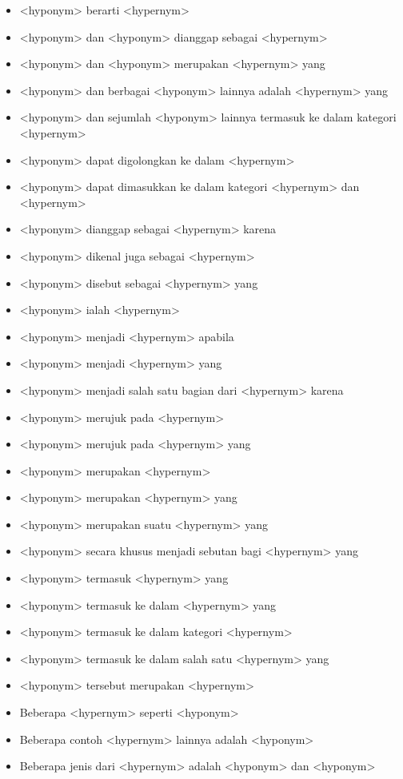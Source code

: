 \begin{itemize}
  \item <hyponym> berarti <hypernym>
  \item <hyponym> dan <hyponym> dianggap sebagai <hypernym>
  \item <hyponym> dan <hyponym> merupakan <hypernym> yang
  \item <hyponym> dan berbagai <hyponym> lainnya adalah <hypernym> yang
  \item <hyponym> dan sejumlah <hyponym> lainnya termasuk ke dalam kategori <hypernym>
  \item <hyponym> dapat digolongkan ke dalam <hypernym>
  \item <hyponym> dapat dimasukkan ke dalam kategori <hypernym> dan <hypernym>
  \item <hyponym> dianggap sebagai <hypernym> karena
  \item <hyponym> dikenal juga sebagai <hypernym>
  \item <hyponym> disebut sebagai <hypernym> yang
  \item <hyponym> ialah <hypernym>
  \item <hyponym> menjadi <hypernym> apabila
  \item <hyponym> menjadi <hypernym> yang
  \item <hyponym> menjadi salah satu bagian dari <hypernym> karena
  \item <hyponym> merujuk pada <hypernym>
  \item <hyponym> merujuk pada <hypernym> yang
  \item <hyponym> merupakan <hypernym>
  \item <hyponym> merupakan <hypernym> yang
  \item <hyponym> merupakan suatu <hypernym> yang
  \item <hyponym> secara khusus menjadi sebutan bagi <hypernym> yang
  \item <hyponym> termasuk <hypernym> yang
  \item <hyponym> termasuk ke dalam <hypernym> yang
  \item <hyponym> termasuk ke dalam kategori <hypernym>
  \item <hyponym> termasuk ke dalam salah satu <hypernym> yang
  \item <hyponym> tersebut merupakan <hypernym>
  \item Beberapa <hypernym> seperti <hyponym>
  \item Beberapa contoh <hypernym> lainnya adalah <hyponym>
  \item Beberapa jenis dari <hypernym> adalah <hyponym> dan <hyponym>

\end{itemize}
